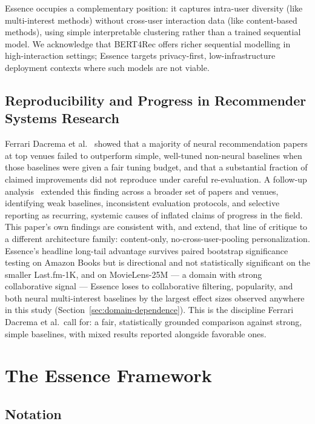\documentclass[11pt,a4paper]{article}
\begin{document}
Essence occupies a complementary position: it captures intra-user diversity
(like multi-interest methods) without cross-user interaction data (like content-based
methods), using simple interpretable clustering rather than a trained
sequential model. We acknowledge that BERT4Rec offers richer sequential
modelling in high-interaction settings; Essence targets privacy-first,
low-infrastructure deployment contexts where such models are not viable.

\subsection{Reproducibility and Progress in Recommender Systems Research}

Ferrari Dacrema et al.~\cite{dacrema2019} showed that a majority of neural
recommendation papers at top venues failed to outperform simple, well-tuned
non-neural baselines when those baselines were given a fair tuning budget,
and that a substantial fraction of claimed improvements did not reproduce
under careful re-evaluation. A follow-up analysis~\cite{dacrema2021}
extended this finding across a broader set of papers and venues, identifying
weak baselines, inconsistent evaluation protocols, and selective reporting
as recurring, systemic causes of inflated claims of progress in the field.
This paper's own findings are consistent with, and extend, that line of
critique to a different architecture family: content-only,
no-cross-user-pooling personalization. Essence's headline long-tail
advantage survives paired bootstrap significance testing on Amazon Books
but is directional and not statistically significant on the smaller
Last.fm-1K, and on MovieLens-25M --- a domain with strong collaborative
signal --- Essence loses to collaborative filtering, popularity, and both
neural multi-interest baselines by the largest effect sizes observed
anywhere in this study (Section~\ref{sec:domain-dependence}). This is the
discipline Ferrari Dacrema et al.\ call for: a fair, statistically grounded
comparison against strong, simple baselines, with mixed results reported
alongside favorable ones.

\section{The Essence Framework}
\label{sec:framework}

\subsection{Notation}
\end{document}
